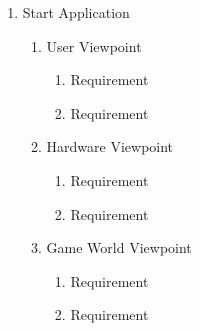 \documentclass[]{article}
\begin{document}
\begin{enumerate}[{BE}1.]
	\item Start Application
	\begin{enumerate}[{VP1}.1]
		\item User Viewpoint
			\begin{enumerate}
				\item Requirement
				\item Requirement
			\end{enumerate}
		\item Hardware Viewpoint
			\begin{enumerate}
				\item Requirement
				\item Requirement
			\end{enumerate}
		\item Game World Viewpoint
			\begin{enumerate}
				\item Requirement
				\item Requirement
			\end{enumerate}
			

\end{enumerate}
\end{enumerate}
\end{document}
